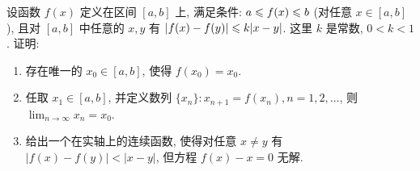 \begin{exercise}[2.C.8]
    设函数 $f(x)$ 定义在区间 $[a,b]$ 上, 满足条件: $a \leqslant f(x) \leqslant b$ (对任意 $x \in [a,b]$), 且对 $[a,b]$ 中任意的 $x,y$ 有 $|f(x)-f(y)| \leqslant k|x-y|$. 这里 $k$ 是常数, $0<k<1$. 证明:
    \begin{enumerate}
        \item 存在唯一的 $x_0 \in [a,b]$, 使得 $f(x_0)=x_0$.
        \item 任取 $x_1 \in [a,b]$, 并定义数列 $\{x_n\}: x_{n+1} = f(x_n), n=1,2,\dots$, 则 $\lim_{n \to \infty} x_n = x_0$.
        \item 给出一个在实轴上的连续函数, 使得对任意 $x \ne y$ 有 $|f(x)-f(y)| < |x-y|$, 但方程 $f(x)-x=0$ 无解.
    \end{enumerate}
\end{exercise}

